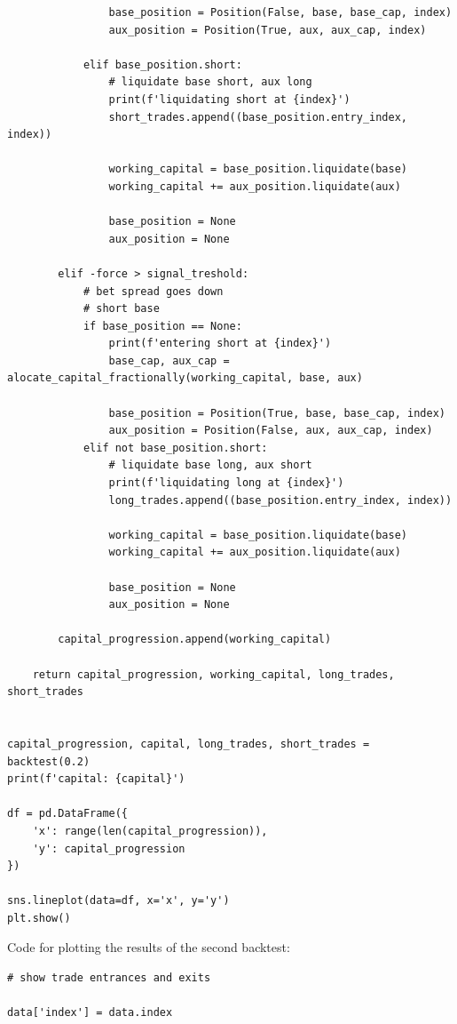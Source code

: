 \documentclass{article}
\begin{document}
\begin{spacing}{2.0}
\begin{lstlisting}
                base_position = Position(False, base, base_cap, index)
                aux_position = Position(True, aux, aux_cap, index)

            elif base_position.short:
                # liquidate base short, aux long
                print(f'liquidating short at {index}')
                short_trades.append((base_position.entry_index, index))

                working_capital = base_position.liquidate(base)
                working_capital += aux_position.liquidate(aux)

                base_position = None
                aux_position = None

        elif -force > signal_treshold:
            # bet spread goes down
            # short base
            if base_position == None:
                print(f'entering short at {index}')
                base_cap, aux_cap = alocate_capital_fractionally(working_capital, base, aux)

                base_position = Position(True, base, base_cap, index)
                aux_position = Position(False, aux, aux_cap, index)
            elif not base_position.short:
                # liquidate base long, aux short
                print(f'liquidating long at {index}')
                long_trades.append((base_position.entry_index, index))

                working_capital = base_position.liquidate(base)
                working_capital += aux_position.liquidate(aux)

                base_position = None
                aux_position = None

        capital_progression.append(working_capital)

    return capital_progression, working_capital, long_trades, short_trades


capital_progression, capital, long_trades, short_trades = backtest(0.2)
print(f'capital: {capital}')

df = pd.DataFrame({
    'x': range(len(capital_progression)),
    'y': capital_progression
})

sns.lineplot(data=df, x='x', y='y')
plt.show()
\end{lstlisting}

Code for plotting the results of the second backtest:

\begin{lstlisting}
# show trade entrances and exits

data['index'] = data.index


\end{lstlisting}
\end{spacing}
\end{document}

